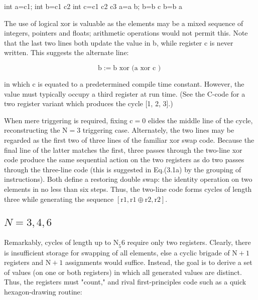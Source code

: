 \begin{CJK}{UTF8}{gbsn}
\begin{algorithm}

	  \Register int  a=c1;  
 \Register int  b=c1 \Xor c2 \;
 \Constant int  c=c1 \Xor c2 \Xor c3 \;
 \Repeat {}  
 a=a \Xor b;  
 b=b \Xor c \; 
 b=b \Xor a \;
 	 \end{algorithm}
\DecMargin{1em} 



The use of logical xor is valuable as the elements may be a mixed sequence of integers, pointers and floats; arithmetic operations would not permit this. Note that the last two lines both update the value in b, while register c is never written. This suggests the alternate line:

$$
\mathrm{b}:=\mathrm{b} \text { xor (a xor } \mathrm{c} \text { ) }
$$

in which $\mathrm{c}$ is equated to a predetermined compile time constant. However, the value must typically occupy a third register at run time. (See the C-code for a two register variant which produces the cycle [1, 2, 3].)


When mere triggering is required, fixing $\mathrm{c}=0$ elides the middle line of the cycle, reconstructing the $\mathrm{N}=3$ triggering case. Alternately, the two lines may be regarded as the first two of three lines of the familiar xor swap code. Because the final line of the latter matches the first, three passes through the two-line xor code produce the same sequential action on the two registers as do two passes through the three-line code (this is suggested in Eq.(3.1a) by the grouping of instructions). Both define a restoring double swap: the identity operation on two elements in no less than six steps. Thus, the two-line code forms cycles of length three while generating the sequence $[\mathrm{r} 1, \mathrm{r} 1 \oplus \mathrm{r} 2, \mathrm{r} 2]$.

\subsection*{$N=3,4,6$}

Remarkably, cycles of length up to $\mathrm{N}_{\overline{5}} 6$ require only two registers. Clearly, there is insufficient storage for swapping of all elements, else a cyclic brigade of $\mathrm{N}+1$ registers and $\mathrm{N}+1$ assignments would suffice. Instead, the goal is to derive a set of values (on one or both registers) in which all generated values are distinct. Thus, the registers must "count," and rival first-principles code such as a quick hexagon-drawing routine:


\end{CJK}
